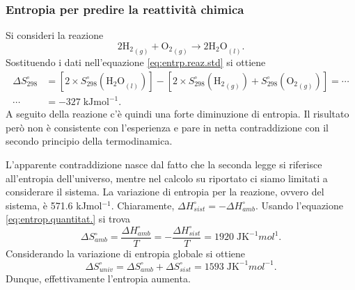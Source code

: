 \subsubsection{Entropia per predire la reattività chimica}
Si consideri la reazione
\begin{equation}
    2{\text{H}_2}_{\left(g\right)}+{\text{O}_2}_{\left(g\right)}\to2{\text{H}_2\text{O}}_{\left(l\right)}.
\end{equation}
Sostituendo i dati nell'equazione \eqref{eq:entrp.reaz.std} si ottiene
\begin{equation}
    \begin{split}
        \Delta S_{298}^\circ&=[2\times S_{298}^\circ({\text{H}_2\text{O}}_{\left(l\right)})]-[2\times S_{298}^\circ({\text{H}_2}_{\left(g\right)})+S_{298}^\circ({\text{O}_2}_{\left(g\right)})]=\cdots\\
        \cdots&=-327\;\text{kJmol}^{-1}.
    \end{split}   
\end{equation}
A seguito della reazione c'è quindi una forte diminuzione di entropia. Il risultato però non è consistente con l'esperienza e pare in netta contraddizione con il secondo principio della termodinamica.

L'apparente contraddizione nasce dal fatto che la seconda legge si riferisce all'entropia dell'universo, mentre nel calcolo su riportato ci siamo limitati a considerare il sistema. La variazione di entropia per la reazione, ovvero del sistema, è 571.6 kJmol$^{-1}$. Chiaramente, $\Delta H_{sist}^\circ=-\Delta H_{amb}^\circ$. Usando l'equazione \eqref{eq:entrop.quantitat.} si trova
\begin{equation}
    \Delta S_{amb}^\circ=\frac{\Delta H_{amb}^\circ}{T}=-\frac{\Delta H_{sist}^\circ}{T}=1920\;\text{JK}^{-1}mol^{1}.
\end{equation}
Considerando la variazione di entropia globale si ottiene
\begin{equation}
    \Delta S_{univ}^\circ=\Delta S_{amb}^\circ+\Delta S_{sist}^\circ=1593\;\text{JK}^{-1}mol^{-1}.
\end{equation}
Dunque, effettivamente l'entropia aumenta.

